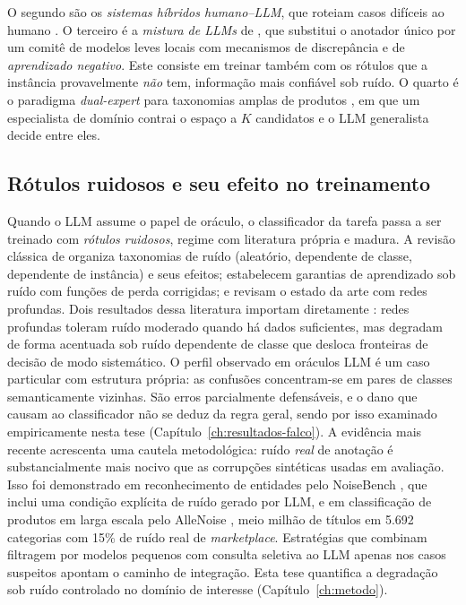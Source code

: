 O segundo são os \emph{sistemas híbridos humano--LLM}, que roteiam casos
difíceis ao humano \citep{Margatina2023}. O terceiro é a \emph{mistura de
LLMs} de \citet{Qi2026MixtureLLMs}, que substitui o anotador único por um
comitê de modelos leves locais com mecanismos de discrepância e de
\emph{aprendizado negativo}. Este consiste em treinar também com os rótulos
que a instância provavelmente \emph{não} tem, informação mais confiável sob
ruído. O quarto é o paradigma \emph{dual-expert} para taxonomias amplas de
produtos \citep{Cheng2024DualExpert}, em que um especialista de domínio contrai
o espaço a $K$ candidatos e o LLM generalista decide entre eles.

\subsection{Rótulos ruidosos e seu efeito no treinamento}
\label{sssec:llm_desafios}

Quando o LLM assume o papel de oráculo, o classificador da tarefa passa a ser
treinado com \emph{rótulos ruidosos}, regime com literatura própria e madura.
A revisão clássica de \citet{Frenay2014} organiza taxonomias de ruído
(aleatório, dependente de classe, dependente de instância) e seus efeitos;
\citet{Natarajan2013} estabelecem garantias de aprendizado sob ruído com
funções de perda corrigidas; e \citet{Song2023NoisyLabels} revisam o estado da
arte com redes profundas. Dois resultados dessa literatura importam diretamente
\citep{Frenay2014, Song2023NoisyLabels}: redes
profundas toleram ruído moderado quando há dados suficientes, mas degradam de
forma acentuada sob ruído dependente de classe que desloca fronteiras de
decisão de modo sistemático. O perfil observado em oráculos LLM é um caso
particular com estrutura própria: as confusões concentram-se em pares de
classes semanticamente vizinhas. São erros parcialmente defensáveis, e o dano
que causam ao classificador não se deduz da regra geral, sendo por isso
examinado empiricamente nesta tese
(Capítulo~\ref{ch:resultados-falco}). A evidência mais recente acrescenta uma
cautela metodológica: ruído \emph{real} de anotação é substancialmente mais
nocivo que as corrupções sintéticas usadas em avaliação. Isso foi demonstrado
em reconhecimento de entidades pelo NoiseBench
\citep{Merdjanovska2024NoiseBench}, que inclui uma condição explícita de
ruído gerado por LLM, e em classificação de produtos em
larga escala pelo AlleNoise \citep{Raczkowska2024AlleNoise}, meio milhão de
títulos em 5.692 categorias com 15\% de ruído real de \textit{marketplace}.
Estratégias que combinam filtragem por modelos pequenos com consulta seletiva
ao LLM apenas nos casos suspeitos \citep{Yuan2025NoiseAL} apontam o caminho de
integração. Esta tese quantifica a degradação sob ruído controlado no domínio
de interesse (Capítulo~\ref{ch:metodo}).

